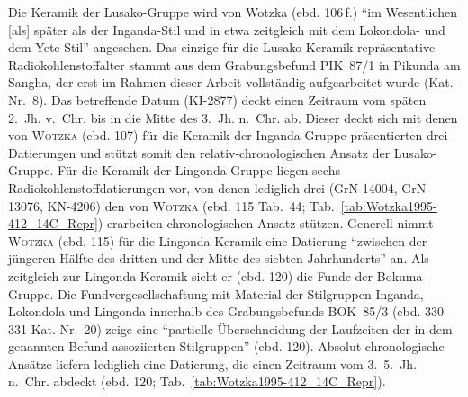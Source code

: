 Die Keramik der Lusako-Gruppe wird von Wotzka (ebd. 106\,f.) \enquote{im Wesentlichen [als] später als der Inganda-Stil und in etwa zeitgleich mit dem Lokondola- und dem Yete-Stil} angesehen. Das einzige für die Lusako-Keramik repräsentative Radiokohlenstoffalter stammt aus dem Grabungsbefund PIK~87/1 in Pikunda am \mbox{Sangha}, der erst im Rahmen dieser Arbeit vollständig aufgearbeitet wurde (Kat.-Nr.~8). Das betreffende Datum (KI-2877) deckt einen Zeitraum vom späten 2.~Jh. v.~Chr. bis in die Mitte des 3.~Jh. n.~Chr. ab. Dieser deckt sich mit denen von \textsc{Wotzka} (ebd. 107) für die Keramik der Inganda-Gruppe präsentierten drei Datierungen und stützt somit den relativ-chronologischen Ansatz der Lusako-Gruppe. Für die Keramik der Lingonda-Gruppe liegen sechs Radiokohlenstoffdatierungen vor, von denen lediglich drei (GrN-14004, GrN-13076, KN-4206) den von \textsc{Wotzka} (ebd. 115 Tab.~44; Tab.~\ref{tab:Wotzka1995-412_14C_Repr}) erarbeiten chronologischen Ansatz stützen. Generell nimmt \textsc{Wotzka} (ebd. 115) für die Lingonda-Keramik eine Datierung \enquote{zwischen der jüngeren Hälfte des dritten und der Mitte des siebten Jahrhunderts} an. Als zeitgleich zur Lingonda-Keramik sieht er (ebd. 120) die Funde der Bokuma-Gruppe. Die Fundvergesellschaftung mit Material der Stilgruppen Inganda, Lokondola und Lingonda innerhalb des Grabungsbefunds BOK~85/3 (ebd. 330--331 Kat.-Nr.~20) zeige eine \enquote{partielle Überschneidung der Laufzeiten der in dem genannten Befund assoziierten Stilgruppen} (ebd. 120). Absolut-chronologische Ansätze liefern lediglich eine Datierung, die einen Zeitraum vom \mbox{3.--5.~Jh.} n.~Chr. abdeckt (ebd. 120; Tab.~\ref{tab:Wotzka1995-412_14C_Repr}).

